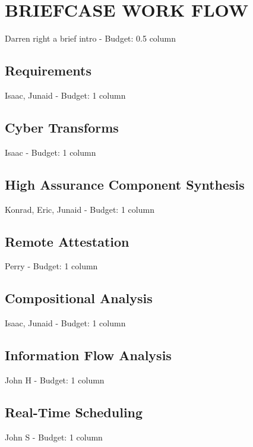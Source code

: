 \documentclass{IEEEcsmag}
\begin{document}
\section{BRIEFCASE WORK FLOW}
Darren right a brief intro -  Budget: 0.5 column
\cite{OSATE}



\subsection{Requirements}
Isaac, Junaid -  Budget: 1 column
\cite{gearcase2020} \cite{dcrypps2019}



\subsection{Cyber Transforms}
Isaac -  Budget: 1 column



\subsection{High Assurance Component Synthesis}
Konrad, Eric, Junaid -  Budget: 1 column
\cite{case-verified-filter} \cite{hardin-co-assurance}
\cite{formal-filter-synth-langsec} \cite{contiguity-types} 

\subsection{Remote Attestation}
Perry -  Budget: 1 column
\cite{copland-attestation} \cite{copland-verification}

\subsection{Compositional Analysis}
Isaac, Junaid -  Budget: 1 column
\cite{case-models-2021}

\subsection{Information Flow Analysis}
John H -  Budget: 1 column



\subsection{Real-Time Scheduling}
John S -  Budget: 1 column
\end{document}
